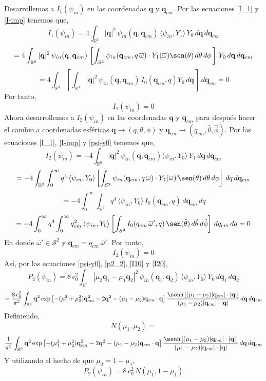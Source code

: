\documentclass[12pt]{book}
\numberwithin{equation}{chapter}
\def\q{\mathbf{q}}
\def\R{\mathbb{R}}
\def\S{\mathcal{S}}
\def\w{\overline{\omega}}
\def\la{\langle}
\def\ra{\rangle}
\def\t{\theta}
\begin{document}
\newpage

Desarrollemos a $I_{1}(\psi_{in})$ en las coordenadas $\q$ y $\q_{cm}$. Por las ecuaciones \eqref{I_1} y \eqref{I-imp} tenemos que,
$$I_{1}(\psi_{in})= 4 \int_{\R^{6}} |\q|^{2}\, \psi_{in}(\q,\q_{cm})\, \la \psi_{in},Y_{1} \ra \, Y_{0} \, d\q\, d\q_{cm}$$
$$= 4 \int_{\R^{6}} |\q|^{2}\, \psi_{in}(\q,\q_{cm})\, \left[ \int_{\S^{2}} \psi_{in}(\q_{cm},q\,\w)\cdot Y_{1}(\w) \sen(\t) \, d\t \, d\phi \, \right] \, Y_{0} \, d\q\, d\q_{cm} $$
$$ = 4 \int_{\R^{3}} \left[ \int_{\R^{3}} |\q|^{2}\, \psi_{in}(\q,\q_{cm})\, I_{0}(\q_{cm},q) Y_{0} \, d\q \, \right] \, d\q_{cm}= 0 $$
Por tanto,
\begin{equation}\label{I10}
I_{1}(\psi_{in})= 0
\end{equation}
Ahora desarrollemos a $I_{2}(\psi_{in})$ en las coordenadas $\q$ y $\q_{cm}$ para despu\'es hacer el cambio a coordenadas esf\'ericas $ \q \rightarrow (q,\t,\phi) $ y $ \q_{cm} \rightarrow (q_{cm},\hat{\t},\hat{\phi}) $. Por las ecuaciones \eqref{I_1}, \eqref{I-imp} y \eqref{psi-y0} tenemos que,
$$ I_{2}(\psi_{in})= -4 \int_{\R^{6}} |\q|^{2}\, \psi_{in}(\q,\q_{cm}) \la \psi_{in},Y_{0} \ra \, Y_{1} \, d\q \, d\q_{cm}$$
$$= -4 \int_{\R^{3}} \int_{0}^{\infty} q^{4}\,\la \psi_{in},Y_{0} \ra \left[ \int_{\S^{2}} \psi_{in}(\q_{cm},q\,\w) \cdot Y_{1}(\w) \, \sen(\t) \, d\t \, d\phi \right] \, dq \, d\q_{cm} $$
$$= -4 \int_{0}^{\infty} \int_{\R^{3}} q^{4}\,\la \psi_{in},Y_{0} \ra \, I_{0}(\q_{cm},q) \, d\q_{cm}\, dq $$
$$= -4 \int_{0}^{\infty} q^{4} \int_{0}^{\infty} q_{cm}^{2} \, \la \psi_{in} , Y_{0} \ra \left[ \int_{\S^{2}} I_{0}(q_{cm}\,\w ' ,q) \, \sen(\hat{\t}) \, d\hat{\t}\, d\hat{\phi} \right] \, dq_{cm}\, dq =0 $$
En donde $\w ' \in \S^{2}$ y $\q_{cm}= q_{cm} \, \w '$. Por tanto,
\begin{equation}\label{I20}
I_{2}(\psi_{in})= 0
\end{equation}
As\'i, por las ecuaciones \eqref{psi-y0}, \eqref{p2_2}, \eqref{I10} y \eqref{I20},
$$ P_{2}(\psi_{in}) = 8\,c_{0}^{2} \int_{\R^{6}} |\mu_{2}\q_{1} -\mu_{1}\q_{2}|^{2}\, \psi_{in}(\q_{1},\q_{2})\, \la \psi_{in},Y_{0} \ra \, Y_{0} \, d\q_{1}\, d\q_{2} $$
$$= \frac{8\, c_{0}^{2}}{\pi^{3}} \int_{\R^{6}} \q^{2} \exp \left[ -(\mu_{1}^{2}+\mu_{2}^{2})\q_{cm}^{2} -2\q^{2} - (\mu_{1}-\mu_{2}) \q_{cm} \cdot \q \right] \frac{ \senh \left[ (\mu_{1}-\mu_{2}) |\q_{cm}|\cdot |\q|\right]}{(\mu_{1}-\mu_{2}) |\q_{cm}|\cdot |\q|}\, d\q \, d\q_{cm} $$
Definiendo,
$$ N(\mu_{1},\mu_{2})= $$
\begin{equation}\label{N}
\frac{1}{\pi^{3}} \int_{\R^{6}} \q^{2} \exp \left[ -(\mu_{1}^{2}+\mu_{2}^{2})\q_{cm}^{2} -2\q^{2} - (\mu_{1}-\mu_{2}) \q_{cm} \cdot \q \right] \frac{ \senh \left[ (\mu_{1}-\mu_{2}) |\q_{cm}|\cdot |\q|\right]}{(\mu_{1}-\mu_{2}) |\q_{cm}|\cdot |\q|}\, d\q \, d\q_{cm}
\end{equation}
Y utilizando el hecho de que $\mu_{2} = 1- \mu_{1}$,
\begin{equation}\label{p2-2}
P_{2}(\psi_{in}) = 8\,c_{0}^{2}\, N(\mu_{1},1-\mu_{1})
\end{equation}
\end{document}
